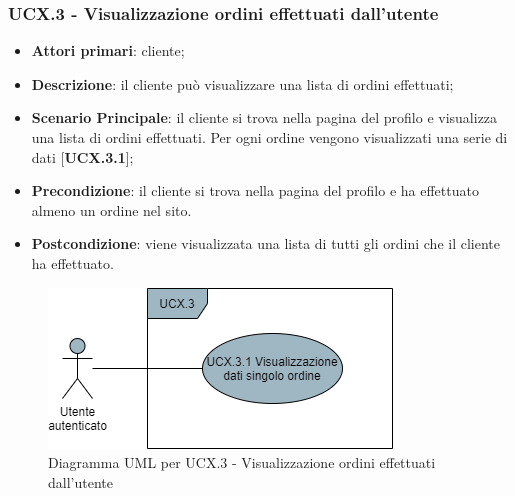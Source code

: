\subsubsection{UCX.3 - Visualizzazione ordini effettuati dall'utente}
\begin{itemize}
\item \textbf{Attori primari}: cliente;
\item \textbf{Descrizione}: il cliente può visualizzare una lista di ordini effettuati;
\item \textbf{Scenario Principale}: il cliente si trova nella pagina del profilo e visualizza una lista di ordini effettuati. Per ogni ordine vengono visualizzati una serie di dati [\textbf{UCX.3.1}];
\item \textbf{Precondizione}: il cliente si trova nella pagina del profilo e ha effettuato almeno un ordine nel sito.
\item \textbf{Postcondizione}: viene visualizzata una lista di tutti gli ordini che il cliente ha effettuato.
\end{itemize}

\begin{figure}[H]
\centering
\includegraphics[scale=0.6]{res/UseCase/Immagini/VisualizzazioneOrdini}
\caption{Diagramma UML per UCX.3 - Visualizzazione ordini effettuati dall'utente}
\end{figure}

